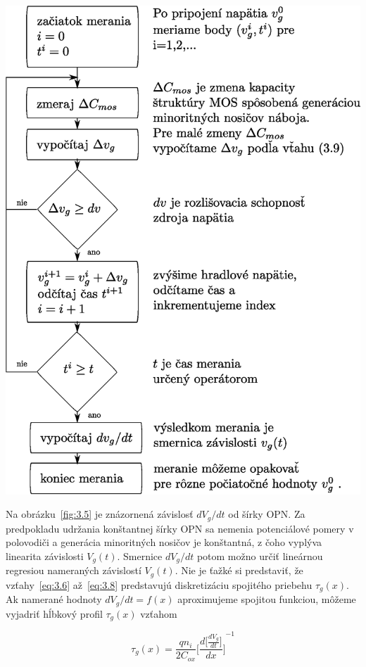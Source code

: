 \begin{diagram}
  \includegraphics[scale=0.55,keepaspectratio]{Figures/diagram-2.EPS}\label{diagram:2}
\end{diagram}

Na obrázku~\ref{fig:3.5} je znázornená závislosť ${dV_g}/{dt}$ od
šírky OPN\@. Za predpokladu udržania konštantnej šírky OPN sa nemenia
potenciálové pomery v polovodiči a generácia minoritných nosičov je
konštantná, z čoho vyplýva linearita závislosti $V_g(t)$. Smernice
${dV_g}/{dt}$ potom možno určiť lineárnou regresiou nameraných
závislostí $V_g(t)$. Nie je ťažké si predstaviť, že
vzťahy~\ref{eq:3.6} až~\ref{eq:3.8} predstavujú diskretizáciu
spojitého priebehu $\tau_g(x)$. Ak namerané hodnoty ${dV_g}/{dt}=f(x)$
aproximujeme spojitou funkciou, môžeme vyjadriť hĺbkový profil
$\tau_g(x)$ vzťahom

\begin{equation}\label{eq:3.10}
  \tau_g(x) = \frac{qn_i}{2C_{ox}} {\Bigg[\frac{d\big[\frac{dV_g}{dt}\big]}{dx}\Bigg]}^{-1}
\end{equation}

